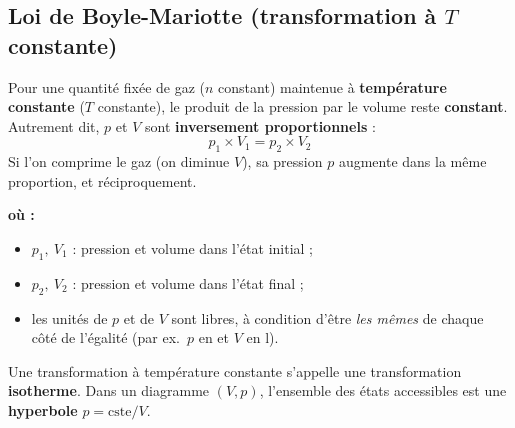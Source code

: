 \documentclass[11pt,a4paper]{article}
\newenvironment{ou}{%
  \par\smallskip\noindent\textbf{où :}\nopagebreak
  \begin{itemize}[leftmargin=1.8em,topsep=2pt,itemsep=1.5pt,parsep=0pt]}%
  {\end{itemize}}
\begin{document}
\subsection{Loi de Boyle-Mariotte (transformation à \texorpdfstring{$T$}{T} constante)}

\begin{theoreme}
Pour une quantité fixée de gaz ($n$ constant) maintenue à \textbf{température constante} ($T$
constante), le produit de la pression par le volume reste \textbf{constant}. Autrement dit, $p$ et $V$
sont \textbf{inversement proportionnels} :
\[ \boxed{\,p_1\times V_1 = p_2\times V_2\,} \]
Si l'on comprime le gaz (on diminue $V$), sa pression $p$ augmente dans la même proportion, et
réciproquement.
\end{theoreme}

\begin{ou}
  \item $p_1,\ V_1$ : pression et volume dans l'état initial ;
  \item $p_2,\ V_2$ : pression et volume dans l'état final ;
  \item les unités de $p$ et de $V$ sont libres, à condition d'être \emph{les mêmes} de chaque côté de
        l'égalité (par ex.\ $p$ en \si{\atm} et $V$ en \si{\litre}).
\end{ou}

\noindent Une transformation à température constante s'appelle une transformation \textbf{isotherme}.
Dans un diagramme $(V,p)$, l'ensemble des états accessibles est une \textbf{hyperbole}
$p=\text{cste}/V$.

\begin{center}
\end{center}
\end{document}
